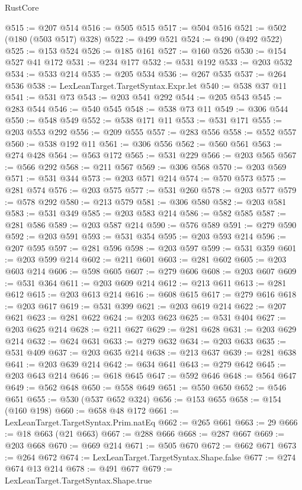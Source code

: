 \begin{lexlean}{RustCore}
\begin{coremodule}
@515 := @207 @514
@516 := @505 @515
@517 := @504 @516
@521 := @502 (@180 (@503 @517) @328)
@522 := @499 @521
@524 := @490 (@492 @522)
@525 := @153 @524
@526 := @185 @161
@527 := @160 @526
@530 := @154 @527 @41 @172
@531 := @234 @177
@532 := @531 @192
@533 := @203 @532
@534 := @533 @214
@535 := @205 @534
@536 := @267 @535
@537 := @264 @536
@538 := LexLeanTarget.TargetSyntax.Expr.let
@540 := @538 @37 @11
@541 := @531 @73
@543 := @203 @541 @292
@544 := @205 @543
@545 := @283 @544
@546 := @540 @545
@548 := @538 @73 @11
@549 := @306 @544
@550 := @548 @549
@552 := @538 @171 @11
@553 := @531 @171
@555 := @203 @553 @292
@556 := @209 @555
@557 := @283 @556
@558 := @552 @557
@560 := @538 @192 @11
@561 := @306 @556
@562 := @560 @561
@563 := @274 @428
@564 := @563 @172
@565 := @531 @229
@566 := @203 @565
@567 := @566 @292
@568 := @211 @567
@569 := @306 @568
@570 := @203 @569
@571 := @531 @344
@573 := @203 @571 @214
@574 := @570 @573
@575 := @281 @574
@576 := @203 @575
@577 := @531 @260
@578 := @203 @577
@579 := @578 @292
@580 := @213 @579
@581 := @306 @580
@582 := @203 @581
@583 := @531 @349
@585 := @203 @583 @214
@586 := @582 @585
@587 := @281 @586
@589 := @203 @587 @214
@590 := @576 @589
@591 := @279 @590
@592 := @203 @591
@593 := @531 @354
@595 := @203 @593 @214
@596 := @207 @595
@597 := @281 @596
@598 := @203 @597
@599 := @531 @359
@601 := @203 @599 @214
@602 := @211 @601
@603 := @281 @602
@605 := @203 @603 @214
@606 := @598 @605
@607 := @279 @606
@608 := @203 @607
@609 := @531 @364
@611 := @203 @609 @214
@612 := @213 @611
@613 := @281 @612
@615 := @203 @613 @214
@616 := @608 @615
@617 := @279 @616
@618 := @203 @617
@619 := @531 @399
@621 := @203 @619 @214
@622 := @207 @621
@623 := @281 @622
@624 := @203 @623
@625 := @531 @404
@627 := @203 @625 @214
@628 := @211 @627
@629 := @281 @628
@631 := @203 @629 @214
@632 := @624 @631
@633 := @279 @632
@634 := @203 @633
@635 := @531 @409
@637 := @203 @635 @214
@638 := @213 @637
@639 := @281 @638
@641 := @203 @639 @214
@642 := @634 @641
@643 := @279 @642
@645 := @203 @643 @214
@646 := @618 @645
@647 := @592 @646
@648 := @564 @647
@649 := @562 @648
@650 := @558 @649
@651 := @550 @650
@652 := @546 @651
@655 := @530 (@537 @652 @324)
@656 := @153 @655
@658 := @154 (@160 @198)
@660 := @658 @48 @172
@661 := LexLeanTarget.TargetSyntax.Prim.natEq
@662 := @265 @661
@663 := 29
@666 := @18 @663 (@21 @663)
@667 := @288 @666
@668 := @287 @667
@669 := @203 @668
@670 := @669 @214
@671 := @505 @670
@672 := @662 @671
@673 := @264 @672
@674 := LexLeanTarget.TargetSyntax.Shape.false
@677 := @274 @674 @13 @214
@678 := @491 @677
@679 := LexLeanTarget.TargetSyntax.Shape.true

\end{coremodule}
\end{lexlean}
